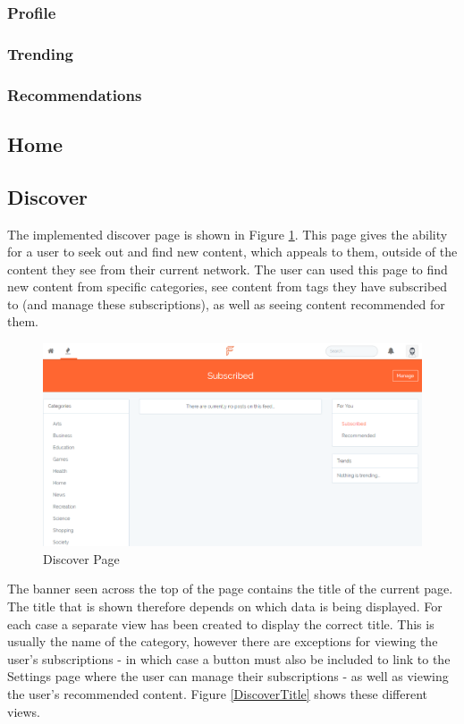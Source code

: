 \subsubsection{Profile}
\subsubsection{Trending}
\subsubsection{Recommendations}

\subsection{Home}
\subsection{Discover}
The implemented discover page is shown in Figure \ref{fig:DiscoverPage}. This page gives the ability for a user to seek out and find new content, which appeals to them, outside of the content they see from their current network. The user can used this page to find new content from specific categories, see content from tags they have subscribed to (and manage these subscriptions), as well as seeing content recommended for them.

\begin{figure}[H]
\centering
\includegraphics[width=\textwidth]{Images/Implementation/DiscoverPage}
\caption{Discover Page}
\label{fig:DiscoverPage}
\end{figure}
The banner seen across the top of the page contains the title of the current page. The title that is shown therefore depends on which data is being displayed. For each case a separate view has been created to display the correct title. This is usually the name of the category, however there are exceptions for viewing the user's subscriptions - in which case a button must also be included to link to the Settings page where the user can manage their subscriptions - as well as viewing the user's recommended content. Figure \ref{DiscoverTitle} shows these different views.


